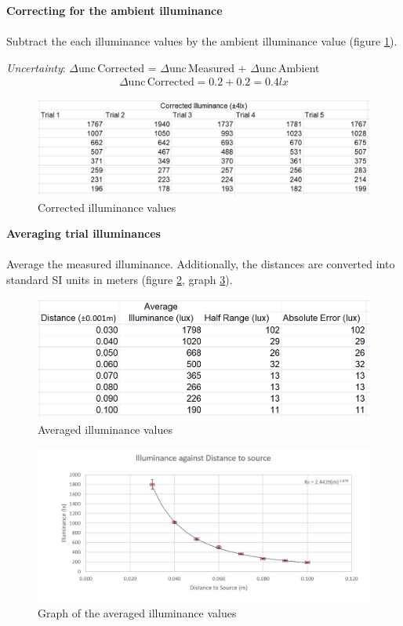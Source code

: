 \documentclass[a4paper,12pt]{article}
\newcommand{\absun}{\Delta \text{unc}\,}
\newcommand{\paragraphnl}[1]{\textbf{#1}\\\\}
\begin{document}
\paragraphnl{Correcting for the ambient illuminance}
Subtract the each illuminance values by the ambient illuminance value (figure \ref{fig:corrected}).

\textit{Uncertainty}: $\absun$Corrected = $\absun$Measured + $\absun$Ambient
\begin{align*}
     \absun \text{Corrected} = 0.2 + 0.2 = 0.4\si{lx}
\end{align*}

\begin{figure}[H]
    \centering
    \includegraphics[scale=0.5]{assets/correcteddata.png}
    \caption{Corrected illuminance values}
    \label{fig:corrected}
\end{figure}

\paragraphnl{Averaging trial illuminances}
Average the measured illuminance. Additionally, the distances are converted into standard SI units in meters (figure \ref{fig:average}, graph \ref{gph:average}).

\begin{figure}[H]
    \centering
    \includegraphics[scale=0.5]{assets/averagedata.png}
    \caption{Averaged illuminance values}
    \label{fig:average}
\end{figure}

\begin{figure}[H]
    \centering
    \includegraphics[width=\textwidth]{assets/averagegraph.png}
    \caption{Graph of the averaged illuminance values}
    \label{gph:average}
\end{figure}
\end{document}
